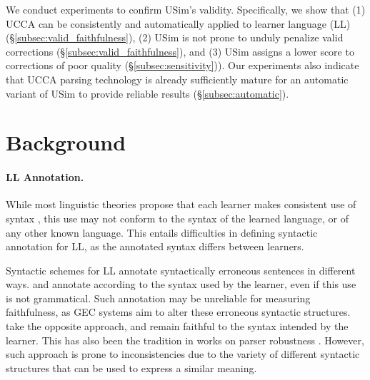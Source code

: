 \documentclass[a4paper, 11pt]{article}
\newcommand{\lc}[1]{\footnote{\color{blue}LC: #1}}
\begin{document}

We conduct experiments to confirm {\sc USim}'s validity.
Specifically, we show that
(1) UCCA can be consistently and automatically applied to learner language (LL) (\S \ref{subsec:valid_faithfulness}), 
(2) {\sc USim} is not prone to unduly penalize valid corrections (\S \ref{subsec:valid_faithfulness}), and 
(3) {\sc USim} assigns a lower score to corrections of poor quality (\S \ref{subsec:sensitivity})).
Our experiments also indicate that UCCA parsing technology is already sufficiently mature for an automatic variant of {\sc USim} to provide reliable results (\S \ref{subsec:automatic}).


\section{Background}


\paragraph{LL Annotation.}
While most linguistic theories propose that each learner makes consistent use of syntax 
\cite{huebner1985system,tarone1983variability}, this use may not conform to the syntax of the learned language, 
or of any other known language. This entails difficulties in defining syntactic annotation for LL, as the annotated syntax differs between learners.

Syntactic schemes for LL annotate syntactically erroneous sentences in different ways.
 and  annotate according 
to the syntax used by the learner, even if this use is not grammatical.
Such annotation may be unreliable for measuring faithfulness, 
as GEC systems aim to alter these erroneous syntactic structures.
 take the opposite approach, and remain faithful to the syntax intended by the learner.
This has also been the tradition in works on parser robustness 
\cite{bigert2005unsupervised,foster2004parsing}. However, such approach is prone to inconsistencies due to the 
variety of different syntactic structures that can be used to express a similar meaning. 
\end{document}
